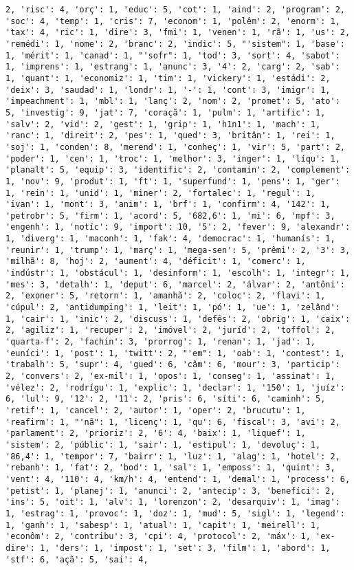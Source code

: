 \documentclass[11pt]{article}
\begin{document}
\begin{Verbatim}[commandchars=\\\{\}]
2, 'risc': 4, 'orç': 1, 'educ': 5, 'cot': 1, 'aind': 2, 'program': 2, 'soc': 4, 'temp': 1, 'cris': 7, 'econom': 1, 'polêm': 2, 'enorm': 1, 'tax': 4, 'ric': 1, 'dire': 3, 'fmi': 1, 'venen': 1, 'rã': 1, 'us': 2, 'remédi': 1, 'nome': 2, 'branc': 2, 'indic': 5, "'sistem": 1, 'base': 1, 'mérit': 1, 'canad': 1, "'sofr": 1, 'tod': 3, 'sort': 4, 'sabot': 1, 'imprens': 1, 'estrang': 1, 'anunc': 3, '4': 2, 'carg': 2, 'sab': 1, 'quant': 1, 'economiz': 1, 'tim': 1, 'vickery': 1, 'estádi': 2, 'deix': 3, 'saudad': 1, 'londr': 1, '-': 1, 'cont': 3, 'imigr': 1, 'impeachment': 1, 'mbl': 1, 'lanç': 2, 'nom': 2, 'promet': 5, 'ato': 5, 'investig': 9, 'jat': 7, 'coraçã': 1, 'pulm': 1, 'artific': 1, 'salv': 2, 'vid': 2, 'gest': 1, 'grip': 1, 'h1n1': 1, 'mach': 1, 'ranc': 1, 'direit': 2, 'pes': 1, 'qued': 3, 'britân': 1, 'rei': 1, 'soj': 1, 'conden': 8, 'merend': 1, 'conheç': 1, 'vir': 5, 'part': 2, 'poder': 1, 'cen': 1, 'troc': 1, 'melhor': 3, 'inger': 1, 'líqu': 1, 'planalt': 5, 'equip': 3, 'identific': 2, 'contamin': 2, 'complement': 1, 'nov': 9, 'produt': 1, 'ft': 1, 'superfund': 1, 'pens': 1, 'ger': 1, 'rein': 1, 'unid': 1, 'miner': 2, 'fortalec': 1, 'regul': 1, 'ivan': 1, 'mont': 3, 'anim': 1, 'brf': 1, 'confirm': 4, '142': 1, 'petrobr': 5, 'firm': 1, 'acord': 5, '682,6': 1, 'mi': 6, 'mpf': 3, 'engenh': 1, 'notíc': 9, 'import': 10, '5': 2, 'fever': 9, 'alexandr': 1, 'diverg': 1, 'maconh': 1, 'fak': 4, 'democrac': 1, 'humanís': 1, 'reunir': 1, 'trump': 1, 'març': 1, 'mega-sen': 5, 'prêmi': 2, '3': 3, 'milhã': 8, 'hoj': 2, 'aument': 4, 'déficit': 1, 'comerc': 1, 'indústr': 1, 'obstácul': 1, 'desinform': 1, 'escolh': 1, 'integr': 1, 'mes': 3, 'detalh': 1, 'deput': 6, 'marcel': 2, 'álvar': 2, 'antôni': 2, 'exoner': 5, 'retorn': 1, 'amanhã': 2, 'coloc': 2, 'flavi': 1, 'cúpul': 2, 'antidumping': 1, 'leit': 1, 'pó': 1, 'ue': 1, 'zelând': 1, 'cair': 1, 'inic': 2, 'discuss': 1, 'defês': 2, 'obrig': 1, 'caix': 2, 'agiliz': 1, 'recuper': 2, 'imóvel': 2, 'juríd': 2, 'toffol': 2, 'quarta-f': 2, 'fachin': 3, 'prorrog': 1, 'renan': 1, 'jad': 1, 'euníci': 1, 'post': 1, 'twitt': 2, "'em": 1, 'oab': 1, 'contest': 1, 'trabalh': 5, 'supr': 4, 'gued': 6, 'câm': 6, 'mour': 3, 'particip': 2, 'convers': 2, 'ex-mil': 1, 'opos': 1, 'conseg': 1, 'assinat': 1, 'vélez': 2, 'rodrígu': 1, 'explic': 1, 'declar': 1, '150': 1, 'juíz': 6, 'lul': 9, '12': 2, '11': 2, 'pris': 6, 'síti': 6, 'caminh': 5, 'retif': 1, 'cancel': 2, 'autor': 1, 'oper': 2, 'brucutu': 1, 'reafirm': 1, "'nã": 1, 'licenç': 1, 'qu': 6, 'fiscal': 3, 'avi': 2, 'parlament': 2, 'prioriz': 2, '6': 4, 'baix': 1, 'liquef': 1, 'sistem': 2, 'públic': 1, 'sair': 1, 'estipul': 1, 'devoluç': 1, '86,4': 1, 'tempor': 7, 'bairr': 1, 'luz': 1, 'alag': 1, 'hotel': 2, 'rebanh': 1, 'fat': 2, 'bod': 1, 'sal': 1, 'emposs': 1, 'quint': 3, 'vent': 4, '110': 4, 'km/h': 4, 'entend': 1, 'demal': 1, 'process': 6, 'petist': 1, 'planej': 1, 'anunci': 2, 'antecip': 3, 'benefíci': 2, 'ins': 5, 'oit': 1, 'alv': 1, 'lorenzon': 2, 'desarquiv': 1, 'imag': 1, 'estrag': 1, 'provoc': 1, 'doz': 1, 'mud': 5, 'sigl': 1, 'legend': 1, 'ganh': 1, 'sabesp': 1, 'atual': 1, 'capit': 1, 'meirell': 1, 'econôm': 2, 'contribu': 3, 'cpi': 4, 'protocol': 2, 'máx': 1, 'ex-dire': 1, 'ders': 1, 'impost': 1, 'set': 3, 'film': 1, 'abord': 1, 'stf': 6, 'açã': 5, 'sai': 4, 
\end{Verbatim}
\end{document}
